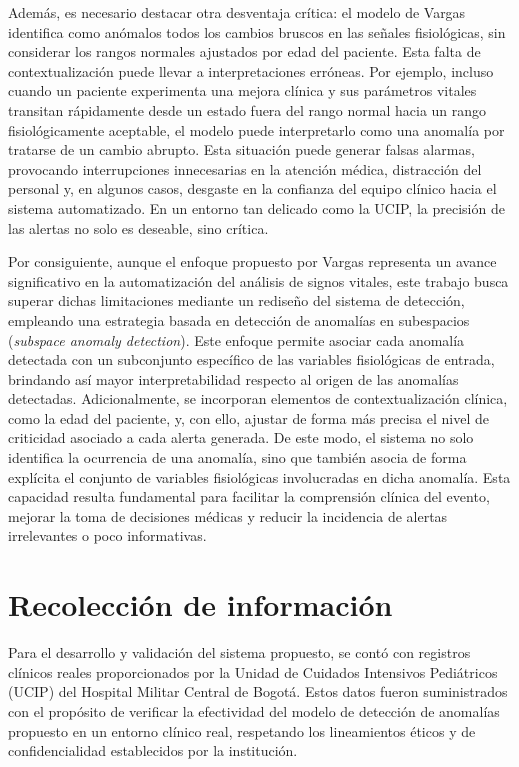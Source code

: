 Además, es necesario destacar otra desventaja crítica: el modelo de Vargas identifica como anómalos todos los cambios bruscos en las señales fisiológicas, sin considerar los rangos normales ajustados por edad del paciente. Esta falta de contextualización puede llevar a interpretaciones erróneas. Por ejemplo, incluso cuando un paciente experimenta una mejora clínica y sus parámetros vitales transitan rápidamente desde un estado fuera del rango normal hacia un rango fisiológicamente aceptable, el modelo puede interpretarlo como una anomalía por tratarse de un cambio abrupto. Esta situación puede generar falsas alarmas, provocando interrupciones innecesarias en la atención médica, distracción del personal y, en algunos casos, desgaste en la confianza del equipo clínico hacia el sistema automatizado. En un entorno tan delicado como la UCIP, la precisión de las alertas no solo es deseable, sino crítica.

Por consiguiente, aunque el enfoque propuesto por Vargas representa un avance significativo en la automatización del análisis de signos vitales, este trabajo busca superar dichas limitaciones mediante un rediseño del sistema de detección, empleando una estrategia basada en detección de anomalías en subespacios (\textit{subspace anomaly detection}). Este enfoque permite asociar cada anomalía detectada con un subconjunto específico de las variables fisiológicas de entrada, brindando así mayor interpretabilidad respecto al origen de las anomalías detectadas. Adicionalmente, se incorporan elementos de contextualización clínica, como la edad del paciente, y, con ello, ajustar de forma más precisa el nivel de criticidad asociado a cada alerta generada. De este modo, el sistema no solo identifica la ocurrencia de una anomalía, sino que también asocia de forma explícita el conjunto de variables fisiológicas involucradas en dicha anomalía. Esta capacidad resulta fundamental para facilitar la comprensión clínica del evento, mejorar la toma de decisiones médicas y reducir la incidencia de alertas irrelevantes o poco informativas.

\section{Recolección de información}

Para el desarrollo y validación del sistema propuesto, se contó con registros clínicos reales proporcionados por la Unidad de Cuidados Intensivos Pediátricos (UCIP) del Hospital Militar Central de Bogotá. Estos datos fueron suministrados con el propósito de verificar la efectividad del modelo de detección de anomalías propuesto en un entorno clínico real, respetando los lineamientos éticos y de confidencialidad establecidos por la institución.

